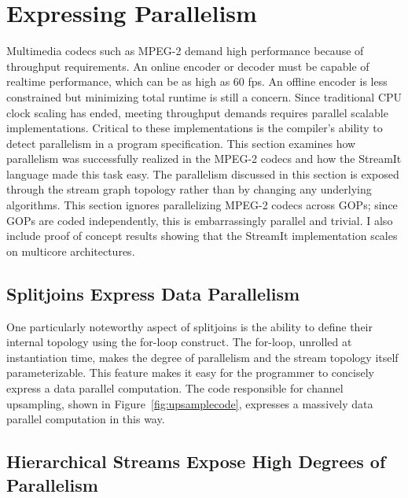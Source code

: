 \chapter{Expressing Parallelism}
\label{chapter:exposing_parallelism}

Multimedia codecs such as MPEG-2 demand high performance because of throughput
requirements. An online encoder or decoder must be capable of realtime performance,
which can be as high as 60 fps. An offline encoder is less constrained but minimizing
total runtime is still a concern. Since traditional CPU clock scaling has ended,
meeting throughput demands requires parallel scalable implementations. 
Critical to these implementations is the compiler's ability to detect parallelism
in a program specification. 
This section examines how parallelism was successfully 
realized in the MPEG-2 codecs and how the StreamIt language made this task easy. The 
parallelism discussed in this section is exposed through the stream graph 
topology rather than by changing any underlying algorithms. This section ignores 
parallelizing MPEG-2 codecs across GOPs; since GOPs are coded independently, 
this is embarrassingly parallel and trivial. I also include proof of 
concept results showing that the StreamIt implementation scales on multicore
architectures.

\section{Splitjoins Express Data Parallelism}

One particularly noteworthy aspect of splitjoins is the ability to define 
their internal topology using the for-loop construct. The for-loop, unrolled at 
instantiation time, makes the degree of parallelism and the stream topology
itself parameterizable. 
This feature makes it easy for the programmer to concisely express a data parallel 
computation. The code responsible for channel upsampling, shown in 
Figure~\ref{fig:upsamplecode}, expresses a massively data parallel computation in 
this way. 

\section{Hierarchical Streams Expose High Degrees of Parallelism}
\label{sec:2d_dct}

